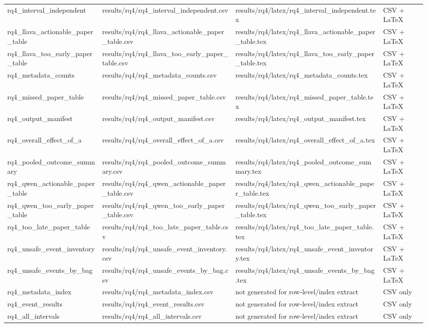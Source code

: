 \begin{table}[tbp]
\begin{tabular}{llll}
rq4\_interval\_independent & results/rq4/rq4\_interval\_independent.csv & results/rq4/latex/rq4\_interval\_independent.tex & CSV + LaTeX \\
rq4\_llava\_actionable\_paper\_table & results/rq4/rq4\_llava\_actionable\_paper\_table.csv & results/rq4/latex/rq4\_llava\_actionable\_paper\_table.tex & CSV + LaTeX \\
rq4\_llava\_too\_early\_paper\_table & results/rq4/rq4\_llava\_too\_early\_paper\_table.csv & results/rq4/latex/rq4\_llava\_too\_early\_paper\_table.tex & CSV + LaTeX \\
rq4\_metadata\_counts & results/rq4/rq4\_metadata\_counts.csv & results/rq4/latex/rq4\_metadata\_counts.tex & CSV + LaTeX \\
rq4\_missed\_paper\_table & results/rq4/rq4\_missed\_paper\_table.csv & results/rq4/latex/rq4\_missed\_paper\_table.tex & CSV + LaTeX \\
rq4\_output\_manifest & results/rq4/rq4\_output\_manifest.csv & results/rq4/latex/rq4\_output\_manifest.tex & CSV + LaTeX \\
rq4\_overall\_effect\_of\_a & results/rq4/rq4\_overall\_effect\_of\_a.csv & results/rq4/latex/rq4\_overall\_effect\_of\_a.tex & CSV + LaTeX \\
rq4\_pooled\_outcome\_summary & results/rq4/rq4\_pooled\_outcome\_summary.csv & results/rq4/latex/rq4\_pooled\_outcome\_summary.tex & CSV + LaTeX \\
rq4\_qwen\_actionable\_paper\_table & results/rq4/rq4\_qwen\_actionable\_paper\_table.csv & results/rq4/latex/rq4\_qwen\_actionable\_paper\_table.tex & CSV + LaTeX \\
rq4\_qwen\_too\_early\_paper\_table & results/rq4/rq4\_qwen\_too\_early\_paper\_table.csv & results/rq4/latex/rq4\_qwen\_too\_early\_paper\_table.tex & CSV + LaTeX \\
rq4\_too\_late\_paper\_table & results/rq4/rq4\_too\_late\_paper\_table.csv & results/rq4/latex/rq4\_too\_late\_paper\_table.tex & CSV + LaTeX \\
rq4\_unsafe\_event\_inventory & results/rq4/rq4\_unsafe\_event\_inventory.csv & results/rq4/latex/rq4\_unsafe\_event\_inventory.tex & CSV + LaTeX \\
rq4\_unsafe\_events\_by\_bag & results/rq4/rq4\_unsafe\_events\_by\_bag.csv & results/rq4/latex/rq4\_unsafe\_events\_by\_bag.tex & CSV + LaTeX \\
rq4\_metadata\_index & results/rq4/rq4\_metadata\_index.csv & not generated for row-level/index extract & CSV only \\
rq4\_event\_results & results/rq4/rq4\_event\_results.csv & not generated for row-level/index extract & CSV only \\
rq4\_all\_intervals & results/rq4/rq4\_all\_intervals.csv & not generated for row-level/index extract & CSV only \\
\bottomrule
\end{tabular}
\end{table}
